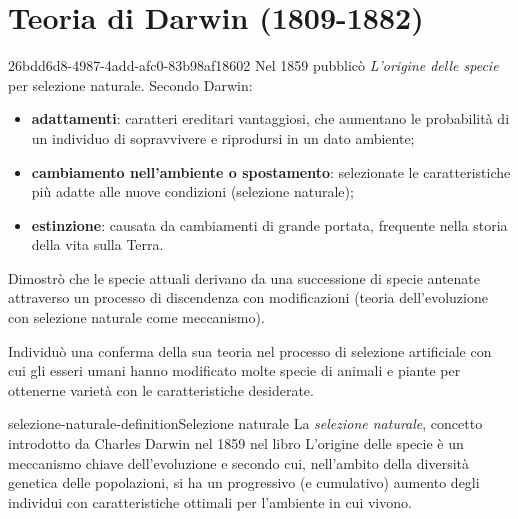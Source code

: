 \documentclass[preview]{standalone}
\begin{document}
\section{Teoria di Darwin (1809-1882)}

\begin{snippet}{26bdd6d8-4987-4add-afc0-83b98af18602}
    Nel 1859 pubblicò \textit{L'origine delle specie} per selezione naturale.
    Secondo Darwin:
    \begin{itemize}
        \item \textbf{adattamenti}: caratteri ereditari vantaggiosi, che aumentano le
            probabilità di un individuo di sopravvivere e riprodursi in un dato
            ambiente;
        \item \textbf{cambiamento nell'ambiente o spostamento}: selezionate le
        caratteristiche più adatte alle nuove condizioni (selezione naturale);
        \item \textbf{estinzione}: causata da cambiamenti di grande portata, frequente nella
        storia della vita sulla Terra.
    \end{itemize}

    Dimostrò che le specie attuali derivano da una successione di specie
    antenate attraverso un processo di discendenza con modificazioni
    (teoria dell'evoluzione con selezione naturale come meccanismo).

    Individuò una conferma della sua teoria nel processo di selezione
    artificiale con cui gli esseri umani hanno modificato molte specie di
    animali e piante per ottenerne varietà con le caratteristiche desiderate.
\end{snippet}

\begin{snippetdefinition}{selezione-naturale-definition}{Selezione naturale}
    La \textit{selezione naturale}, concetto introdotto da Charles Darwin
    nel 1859 nel libro L'origine delle specie è un meccanismo chiave dell'evoluzione
    e secondo cui, nell'ambito della diversità genetica delle popolazioni,
    si ha un progressivo (e cumulativo) aumento degli individui con caratteristiche
    ottimali per l'ambiente in cui vivono.
\end{snippetdefinition}
\end{document}

